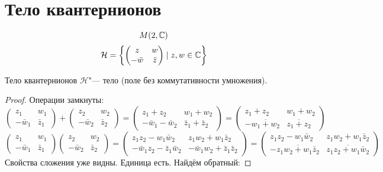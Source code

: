 \section{Тело квантернионов}

$$M(2, \mathbb{C})$$
$$\mathcal{H} = \left\{\left(\begin{matrix}z & w \\ -\bar w & \bar z\end{matrix}\right) \mid z, w \in \mathbb{C}\right\}$$

\begin{theorem}{Тело квантернионов}
$\mathcal{H}$"--- тело (поле без коммутативности умножения).
\end{theorem}
\begin{proof}
Операции замкнуты:
$$\left(\begin{matrix}z_1 & w_1 \\ -\bar w_1 & \bar z_1\end{matrix}\right)+\left(\begin{matrix}z_2 & w_2 \\ -\bar w_2 & \bar z_2\end{matrix}\right) = \left(\begin{matrix}z_1+z_2 & w_1+w_2 \\ -\bar w_1-\bar w_2 & \bar z_1 + \bar z_2\end{matrix}\right) = \left(\begin{matrix}z_1+z_2 & w_1+w_2 \\ -\overline{w_1+w_2} & \overline{z_1+z_2}\end{matrix}\right)$$
$$\left(\begin{matrix}z_1 & w_1 \\ -\bar w_1 & \bar z_1\end{matrix}\right) \left(\begin{matrix}z_2 & w_2 \\ -\bar w_2 & \bar z_2\end{matrix}\right) = \left(\begin{matrix}z_1z_2 - w_1\bar w_2 & z_1 w_2+w_1 \bar z_2 \\ -\bar w_1z_2-\bar z_1\bar w_2 & -\bar w_1 w_2+\bar z_1\bar z_2\end{matrix}\right) = \left(\begin{matrix}z_1z_2 - w_1\bar w_2 & z_1 w_2+w_1 \bar z_2 \\ -\overline{z_1w_2+w_1\bar z_2} & \overline{z_1z_2+w_1\bar w_2}\end{matrix}\right)$$
Свойства сложения уже видны. Единица есть. Найдём обратный:

\end{proof}
